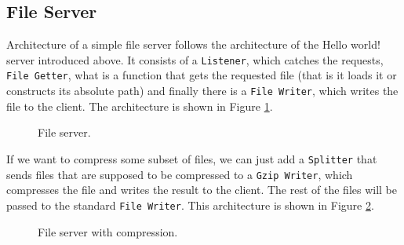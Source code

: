 \documentclass[12pt,a4paper]{article}
\begin{document}
\subsection{File Server}
\label{sec:fileServer}
Architecture of a simple file server follows the architecture of the Hello world!
server introduced above. It consists of a \texttt{Listener}, which catches the requests,
\texttt{File Getter}, what is a function that gets the requested file (that is it loads it or 
constructs its absolute path) and finally there is a \texttt{File Writer}, which
writes the file to the client. The architecture is shown in Figure \ref{fig:fileServer}.
\begin{figure}[h]
\centering
{}
\caption[scale=1.0]{File server.}
\label{fig:fileServer}
\end{figure}

If we want to compress some subset of files, we can just add a \texttt{Splitter}
that sends files that are supposed to be compressed to a \texttt{Gzip Writer}, which
compresses the file and writes the result to the client. The rest of the files
will be passed to the standard \texttt{File Writer}. This architecture is shown in
Figure \ref{fig:fileServer2}.

\begin{figure}[h]
\centering
{}
\caption[scale=1.0]{File server with compression.}
\label{fig:fileServer2}
\end{figure}
\end{document}
